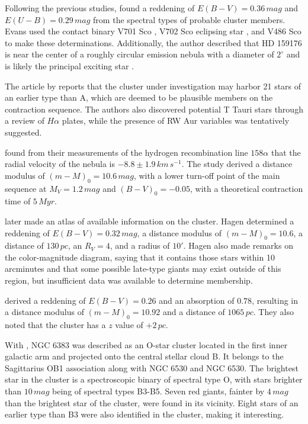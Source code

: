 \documentclass[fleqn,usenatbib,usedcolumn,useAMS]{mnras}
\newcommand{\kms}{\,km\,s^{-1}} %
\begin{document}
Following the previous studies, \citet{1968PhDT........29E} found a reddening of $E(B-V) = 0.36\,mag$ and $E(U-B) = 0.29\,mag$ from the spectral types of probable cluster members. Evans used the contact binary V701 Sco \citep{1961RGOB...27...61E,1965AJ.....70...19E}, V702 Sco eclipsing star \citep{1948AnLei..20....3P}, and V486 Sco \citep{1939PAAS....9R.233S} to make these determinations. Additionally, the author described that HD 159176 is near the center of a roughly circular emission nebula with a diameter of $2^\circ$ and is likely the principal exciting star \citep{1959ApJS....4..257S}.

The article by \citet{1966CoBos..34....1T} reports that the cluster under investigation may harbor 21 stars of an earlier type than A, which are deemed to be plausible members on the contraction sequence. The authors also discovered potential T Tauri stars through a review of $H\alpha$ plates, while the presence of RW Aur variables was tentatively suggested.

\citet{1967ApJ...150..435D} found from their measurements of the hydrogen recombination line $158\alpha$ that the radial velocity of the nebula is $-8.8 \pm 1.9 \kms$. The study derived a distance modulus of $(m-M)_0 = 10.6\,mag$, with a lower turn-off point of the main sequence at $M_V = 1.2\,mag$ and $(B-V)_0 = -0.05$, with a theoretical contraction time of $5\,Myr$.

\citet{1970PDDO....4....1H} later made an atlas of available information on the cluster. Hagen determined a reddening of $E(B-V) = 0.32\,mag$, a distance modulus of $(m-M)_0 = 10.6$, a distance of $130\,pc$, an $R_V = 4$, and a radius of $10'$. Hagen also made remarks on the color-magnitude diagram, saying that it contains those stars within 10 arcminutes and that some possible late-type giants may exist outside of this region, but insufficient data was available to determine membership.

\citet{1971A&AS....4..241B} derived a reddening of $E(B-V) = 0.26$ and an absorption of $0.78$, resulting in a distance modulus of $(m-M)_0 = 10.92$ and a distance of $1065\,pc$. They also noted that the cluster has a $z$ value of $+2\,pc$.

With \citet{1972BAICz..23..126A}, NGC 6383 was described as an O-star cluster located in the first inner galactic arm and projected onto the central stellar cloud B. It belongs to the Sagittarius OB1 association along with NGC 6530 and NGC 6530. The brightest star in the cluster is a spectroscopic binary of spectral type O, with stars brighter than $10\,mag$ being of spectral types B3-B5. Seven red giants, fainter by $4 \,mag$ than the brightest star of the cluster, were found in its vicinity. Eight stars of an earlier type than B3 were also identified in the cluster, making it interesting.
\end{document}
